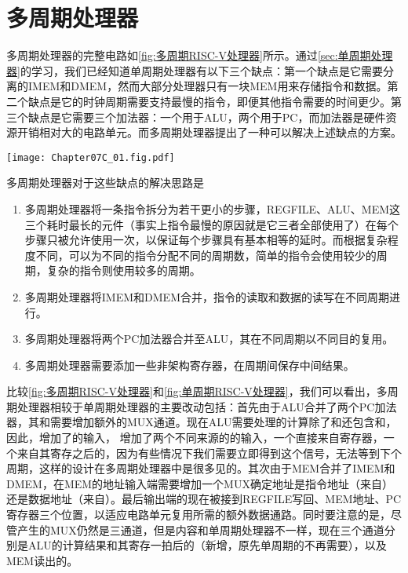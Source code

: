 \section{多周期处理器}

多周期处理器的完整电路如\cref{fig:多周期RISC-V处理器}所示。通过\cref{sec:单周期处理器}的学习，我们已经知道单周期处理器有以下三个缺点：第一个缺点是它需要分离的IMEM和DMEM，然而大部分处理器只有一块MEM用来存储指令和数据。第二个缺点是它的时钟周期需要支持最慢的指令，即便其他指令需要的时间更少。第三个缺点是它需要三个加法器：一个用于ALU，两个用于PC，而加法器是硬件资源开销相对大的电路单元。而多周期处理器提出了一种可以解决上述缺点的方案。
\begin{Figure}
    \texttt{[image: Chapter07C\_01.fig.pdf]}
\end{Figure}

多周期处理器对于这些缺点的解决思路是
\begin{enumerate}
    \item 多周期处理器将一条指令拆分为若干更小的步骤，REGFILE、ALU、MEM这三个耗时最长的元件（事实上指令最慢的原因就是它三者全部使用了）在每个步骤只被允许使用一次，以保证每个步骤具有基本相等的延时。而根据复杂程度不同，可以为不同的指令分配不同的周期数，简单的指令会使用较少的周期，复杂的指令则使用较多的周期。
    \item 多周期处理器将IMEM和DMEM合并，指令的读取和数据的读写在不同周期进行。
    \item 多周期处理器将两个PC加法器合并至ALU，其在不同周期以不同目的复用。
    \item 多周期处理器需要添加一些非架构寄存器，在周期间保存中间结果。
\end{enumerate}
比较\cref{fig:多周期RISC-V处理器}和\cref{fig:单周期RISC-V处理器}，我们可以看出，多周期处理器相较于单周期处理器的主要改动包括：首先由于ALU合并了两个PC加法器，其和需要增加额外的MUX通道。现在ALU需要处理的计算除了和还包含和，因此，增加了的输入， 增加了两个不同来源的的输入，一个直接来自寄存器，一个来自其寄存之后的，因为有些情况下我们需要立即得到这个信号，无法等到下个周期，这样的设计在多周期处理器中是很多见的。其次由于MEM合并了IMEM和DMEM，在MEM的地址输入端需要增加一个MUX确定地址是指令地址（来自）还是数据地址（来自）。最后输出端的现在被接到REGFILE写回、MEM地址、PC寄存器三个位置，以适应电路单元复用所需的额外数据通路。同时要注意的是，尽管产生的MUX仍然是三通道，但是内容和单周期处理器不一样，现在三个通道分别是ALU的计算结果和其寄存一拍后的（新增，原先单周期的不再需要），以及MEM读出的。

